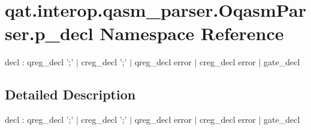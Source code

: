 \hypertarget{namespaceqat_1_1interop_1_1qasm__parser_1_1OqasmParser_1_1p__decl}{\section{qat.\-interop.\-qasm\-\_\-parser.\-Oqasm\-Parser.\-p\-\_\-decl Namespace Reference}
\label{namespaceqat_1_1interop_1_1qasm__parser_1_1OqasmParser_1_1p__decl}
}


decl \-: qreg\-\_\-decl ';' $|$ creg\-\_\-decl ';' $|$ qreg\-\_\-decl error $|$ creg\-\_\-decl error $|$ gate\-\_\-decl  




\subsection{Detailed Description}
decl \-: qreg\-\_\-decl ';' $|$ creg\-\_\-decl ';' $|$ qreg\-\_\-decl error $|$ creg\-\_\-decl error $|$ gate\-\_\-decl 